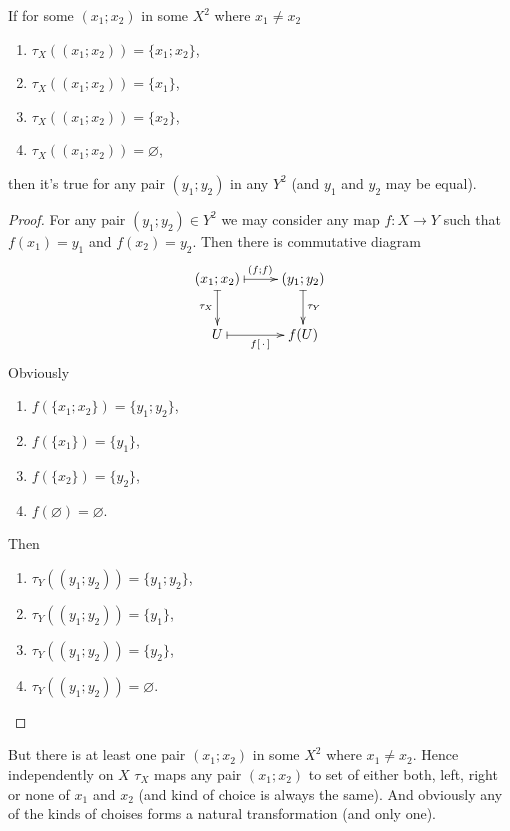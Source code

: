 \documentclass[12pt,a4paper]{article}
\begin{document}
\begin{problem}{16}
\begin{enumerate}
                \begin{lemma}
                    If for some $(x_1; x_2)$ in some $X^2$ where $x_1 \neq x_2$
                    \begin{enumerate}
                        \item $\tau_X((x_1; x_2)) = \{x_1; x_2\}$,
                        \item $\tau_X((x_1; x_2)) = \{x_1\}$,
                        \item $\tau_X((x_1; x_2)) = \{x_2\}$,
                        \item $\tau_X((x_1; x_2)) = \varnothing$,
                    \end{enumerate}
                    then it's true for any pair $(y_1; y_2)$ in any $Y^2$ (and $y_1$ and $y_2$ may be equal).
                \end{lemma}

                \begin{proof}
                    For any pair $(y_1; y_2) \in Y^2$ we may consider any map $f: X \to Y$ such that $f(x_1) = y_1$ and $f(x_2) = y_2$. Then there is commutative diagram
                    \[
                        \xymatrix{
                            (x_1; x_2) \ar@{|->}[r]^{(f; f)} \ar@{|->}[d]_{\tau_X} & (y_1; y_2) \ar@{|->}[d]^{\tau_Y}\\
                            U \ar@{|->}[r]_{f[\,\cdot\,]} & f(U)
                        }
                    \]
                    Obviously
                    \begin{enumerate}
                        \item $f(\{x_1; x_2\}) = \{y_1; y_2\}$,
                        \item $f(\{x_1\}) = \{y_1\}$,
                        \item $f(\{x_2\}) = \{y_2\}$,
                        \item $f(\varnothing) = \varnothing$.
                    \end{enumerate}
                    Then
                    \begin{enumerate}
                        \item $\tau_Y((y_1; y_2)) = \{y_1; y_2\}$,
                        \item $\tau_Y((y_1; y_2)) = \{y_1\}$,
                        \item $\tau_Y((y_1; y_2)) = \{y_2\}$,
                        \item $\tau_Y((y_1; y_2)) = \varnothing$.
                    \end{enumerate}
                \end{proof}

                But there is at least one pair $(x_1; x_2)$ in some $X^2$ where $x_1 \neq x_2$. Hence independently on $X$ $\tau_X$ maps any pair $(x_1; x_2)$ to set of either both, left, right or none of $x_1$ and $x_2$ (and kind of choice is always the same). And obviously any of the kinds of choises forms a natural transformation (and only one).
        \end{enumerate}
    \end{problem}
\end{document}
